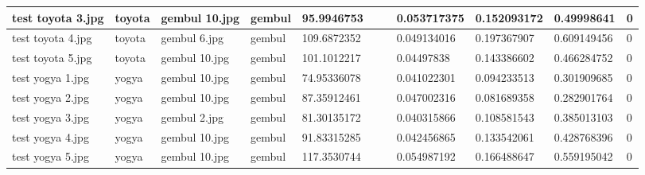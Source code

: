 \begin{landscape}
\begin{longtable}{|p{2cm}|p{1.5cm}|p{2cm}|p{1.5cm}|p{2cm}|p{1cm}|p{2cm}|p{2cm}|p{2cm}|p{2cm}|p{1cm}|}
		test toyota 3.jpg    & toyota           & gembul 10.jpg         & gembul                      & 95.9946753            &                         &                            & 0.053717375           & 0.152093172           & 0.49998641               & 0                \\ \hline
		test toyota 4.jpg    & toyota           & gembul 6.jpg          & gembul                      & 109.6872352           &                         &                            & 0.049134016           & 0.197367907           & 0.609149456              & 0                \\ \hline
		test toyota 5.jpg    & toyota           & gembul 10.jpg         & gembul                      & 101.1012217           &                         &                            & 0.04497838            & 0.143386602           & 0.466284752              & 0                \\ \hline
		test yogya 1.jpg     & yogya            & gembul 10.jpg         & gembul                      & 74.95336078           &                         &                            & 0.041022301           & 0.094233513           & 0.301909685              & 0                \\ \hline
		test yogya 2.jpg     & yogya            & gembul 10.jpg         & gembul                      & 87.35912461           &                         &                            & 0.047002316           & 0.081689358           & 0.282901764              & 0                \\ \hline
		test yogya 3.jpg     & yogya            & gembul 2.jpg          & gembul                      & 81.30135172           &                         &                            & 0.040315866           & 0.108581543           & 0.385013103              & 0                \\ \hline
		test yogya 4.jpg     & yogya            & gembul 10.jpg         & gembul                      & 91.83315285           &                         &                            & 0.042456865           & 0.133542061           & 0.428768396              & 0                \\ \hline
		test yogya 5.jpg     & yogya            & gembul 10.jpg         & gembul                      & 117.3530744           &                         &                            & 0.054987192           & 0.166488647           & 0.559195042              & 0                \\ \hline
	\end{longtable}
\end{landscape}

